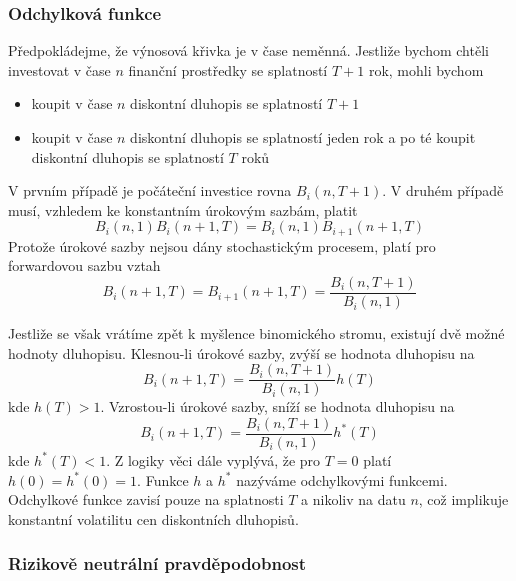 \documentclass[a4paper]{book}
\begin{document}
\subsubsection{Odchylková funkce}

Předpokládejme, že výnosová křivka je v čase neměnná. Jestliže bychom chtěli investovat v čase $n$ finanční prostředky se splatností $T+1$ rok, mohli bychom
\begin{itemize}
\item koupit v čase $n$ diskontní dluhopis se splatností $T+1$
\item koupit v čase $n$ diskontní dluhopis se splatností jeden rok a po té koupit diskontní dluhopis se splatností $T$ roků 
\end{itemize}
V prvním případě je počáteční investice rovna $B_i(n, T + 1)$. V druhém případě musí, vzhledem ke konstantním úrokovým sazbám, platit
\begin{equation*}
B_i(n, 1)B_i(n+1,T) = B_i(n, 1)B_{i+1}(n+1, T)
\end{equation*}
Protože úrokové sazby nejsou dány stochastickým procesem, platí pro forwardovou sazbu vztah
\begin{equation*}
B_i(n+1, T) = B_{i+1}(n+1, T) = \frac{B_i(n, T + 1)}{B_i(n,1)}
\end{equation*}

Jestliže se však vrátíme zpět k myšlence binomického stromu, existují dvě možné hodnoty dluhopisu. Klesnou-li úrokové sazby, zvýší se hodnota dluhopisu na
\begin{equation*}
B_i(n+1, T) = \frac{B_i(n, T+1)}{B_i(n,1)}h(T)
\end{equation*}
kde $h(T) > 1$. Vzrostou-li úrokové sazby, sníží se hodnota dluhopisu na
\begin{equation}
B_i(n+1, T) = \frac{B_i(n, T+1)}{B_i(n,1)}h^{*}(T)
\end{equation}
kde $h^{*}(T) < 1$. Z logiky věci dále vyplývá, že pro $T=0$ platí $h(0) = h^{*}(0) = 1$. Funkce $h$ a $h^{*}$ nazýváme odchylkovými funkcemi. Odchylkové funkce zavisí pouze na splatnosti $T$ a nikoliv na datu $n$, což implikuje konstantní volatilitu cen diskontních dluhopisů.

\subsubsection{Rizikově neutrální pravděpodobnost}
\end{document}
